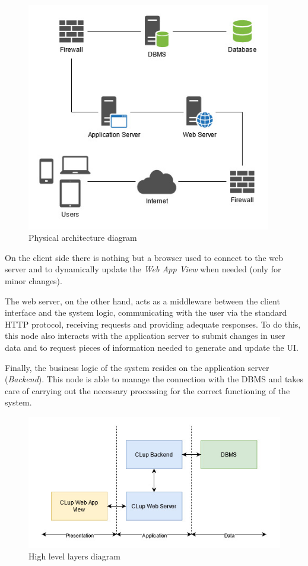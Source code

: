 \begin{figure}[H]
\centering
\includegraphics[width=0.95\textwidth]{architecture_overview/physical_architecture_diagram}
\caption{Physical architecture diagram}
\end{figure}

On the client side there is nothing but a browser used to connect to the web server and to dynamically update the \emph{Web App View} when needed (only for minor changes).

The web server, on the other hand, acts as a middleware between the client interface and the system logic, communicating with the user via the standard HTTP protocol, receiving requests and providing adequate responses. To do this, this node also interacts with the application server to submit changes in user data and to request pieces of information needed to generate and update the UI.

Finally, the business logic of the system resides on the application server (\emph{Backend}). This node is able to manage the connection with the DBMS and takes care of carrying out the necessary processing for the correct functioning of the system.

\begin{figure}[H]
\centering
\includegraphics{architecture_overview/high_level_layers}
\caption{High level layers diagram}
\end{figure}

